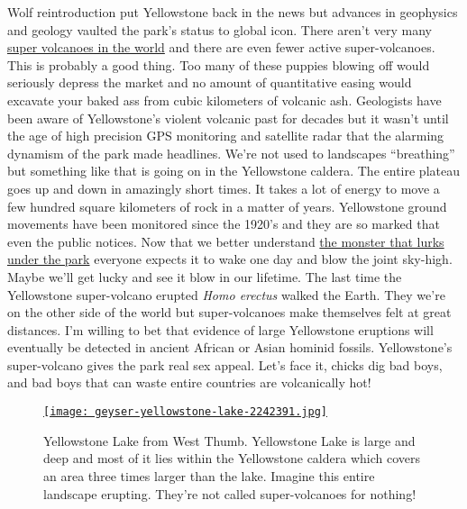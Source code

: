 Wolf reintroduction put Yellowstone back in the news but advances in
geophysics and geology vaulted the park's status to global icon. There
aren't very many
\href{http://wiki.answers.com/Q/How\_many\_super\_volcanoes\_are\_there\_all\_together\_in\_the\_world}{super
volcanoes in the world} and there are even fewer active super-volcanoes.
This is probably a good thing. Too many of these puppies blowing off
would seriously depress the market and no amount of quantitative easing
would excavate your baked ass from cubic kilometers of volcanic ash.
Geologists have been aware of Yellowstone's violent volcanic past for
decades but it wasn't until the age of high precision GPS monitoring and
satellite radar that the alarming dynamism of the park made headlines.
We're not used to landscapes ``breathing'' but something like that is
going on in the Yellowstone caldera. The entire plateau goes up and down
in amazingly short times. It takes a lot of energy to move a few hundred
square kilometers of rock in a matter of years. Yellowstone ground
movements have been monitored since the 1920's and they are so marked
that even the public notices. Now that we better understand
\href{http://ngm.nationalgeographic.com/2009/08/yellowstone/yellowstone-interactive}{the
monster that lurks under the park} everyone expects it to wake one day
and blow the joint sky-high. Maybe we'll get lucky and see it blow in
our lifetime. The last time the Yellowstone super-volcano erupted
\emph{Homo erectus} walked the Earth. They we're on the other side of
the world but super-volcanoes make themselves felt at great distances.
I'm willing to bet that evidence of large Yellowstone eruptions will
eventually be detected in ancient African or Asian hominid fossils.
Yellowstone's super-volcano gives the park real sex appeal. Let's face
it, chicks dig bad boys, and bad boys that can waste entire countries
are volcanically hot!



\begin{SCfigure}
\centering
\centering
\href{http://conceptcontrol.smugmug.com/Trips/USA-and-Canada/North-Western/i-6R2qMdw/A}{\texttt{[image: geyser-yellowstone-lake-2242391.jpg]}}
\caption{Yellowstone Lake from West Thumb. Yellowstone Lake is large and deep and
most of it lies within the Yellowstone caldera which covers an area
three times larger than the lake. Imagine this entire landscape
erupting. They're not called super-volcanoes for nothing!}
\label{fig:4186X4}
\end{SCfigure}



